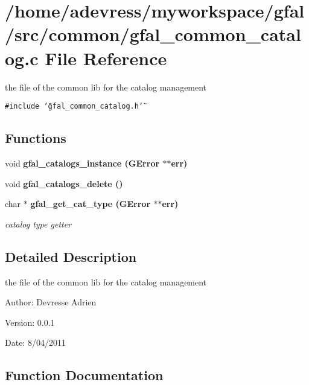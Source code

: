 \section{/home/adevress/myworkspace/gfal/src/common/gfal\_\-common\_\-catalog.c File Reference}
\label{gfal__common__catalog_8c}
the file of the common lib for the catalog management 

{\tt \#include \char`\"{}gfal\_\-common\_\-catalog.h\char`\"{}}\par
\subsection*{Functions}
\begin{CompactItemize}
\item 
void \bf{gfal\_\-catalogs\_\-instance} (GError $\ast$$\ast$err)
\item 
void \bf{gfal\_\-catalogs\_\-delete} ()
\item 
char $\ast$ \bf{gfal\_\-get\_\-cat\_\-type} (GError $\ast$$\ast$err)
\begin{CompactList}\small\item\em catalog type getter \item\end{CompactList}\end{CompactItemize}


\subsection{Detailed Description}
the file of the common lib for the catalog management 

\begin{Desc}
\item[Author:]Devresse Adrien \end{Desc}
\begin{Desc}
\item[Version:]0.0.1 \end{Desc}
\begin{Desc}
\item[Date:]8/04/2011 \end{Desc}


\subsection{Function Documentation}
